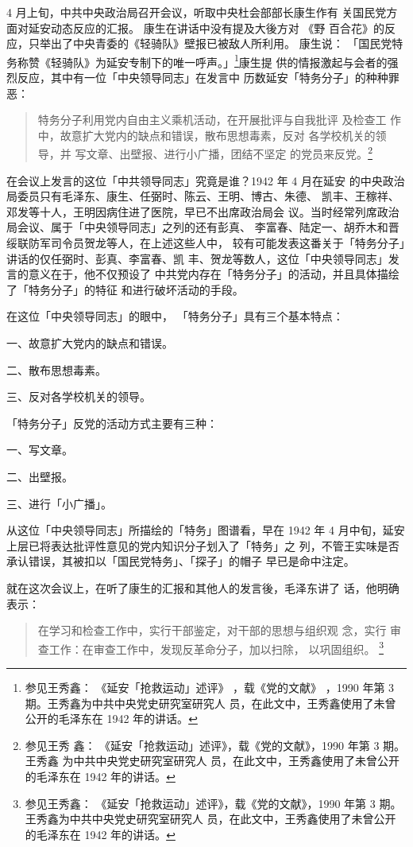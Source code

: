 4 月上旬，中共中央政治局召开会议，听取中央杜会部部长康生作有
关国民党方面对延安动态反应的汇报。
康生在讲话中没有提及大後方对
《野
百合花》的反应，只举出了中央青委的《轻骑队》壁报已被敌人所利用。
康生说：
「国民党特务称赞《轻骑队》为延安专制下的唯一呼声。」\footnote{参见王秀鑫：
《延安「抢救运动」述评》
，载《党的文献》
，1990 年第 3 期。王秀鑫为中共中央党史研究室研究人
员，在此文中，王秀鑫使用了未曾公开的毛泽东在 1942 年的讲话。
}康生提
供的情报激起与会者的强烈反应，其中有一位「中央领导同志」在发言中
历数延安「特务分子」的种种罪恶：
\begin{quote}
{\fzwkai 特务分子利用党内自由主义乘机活动，在开展批评与自我批评 及检查工
作中，故意扩大党内的缺点和错误，散布思想毒素，反对 各学校机关的领导，并
写文章、出壁报、进行小广播，团结不坚定 的党员来反党。\footnote{参见王秀
鑫： 《延安「抢救运动」述评》，载《党的文献》，1990 年第 3 期。王秀鑫
为中共中央党史研究室研究人 员，在此文中，王秀鑫使用了未曾公开的毛泽东在
1942 年的讲话。}} 
\end{quote}

在会议上发言的这位「中共领导同志」究竟是谁？1942 年 4 月在延安
的中央政治局委员只有毛泽东、康生、任弼时、陈云、王明、博古、朱德、
凯丰、王稼祥、邓发等十人，王明因病住进了医院，早已不出席政治局会
议。当时经常列席政治局会议、属于「中央领导同志」之列的还有彭真、
李富春、陆定一、胡乔木和晋绥联防军司令员贺龙等人，在上述这些人中，
较有可能发表这番关于「特务分子」讲话的仅任弼时、彭真、李富春、凯
丰、贺龙等数人，这位「中央领导同志」发言的意义在于，他不仅预设了
中共党内存在「特务分子」的活动，并且具体描绘了「特务分子」的特征
和进行破坏活动的手段。

在这位「中央领导同志」的眼中，
「特务分子」具有三个基本特点：

一、故意扩大党内的缺点和错误。

二、散布思想毒素。

三、反对各学校机关的领导。

「特务分子」反党的活动方式主要有三种：

一、写文章。

二、出壁报。

三、进行「小广播」。

从这位「中央领导同志」所描绘的「特务」图谱看，早在 1942 年 4
月中旬，延安上层已将表达批评性意见的党内知识分子划入了「特务」之
列，不管王实味是否承认错误，其被扣以「国民党特务」、「探子」的帽子
早已是命中注定。

就在这次会议上，在听了康生的汇报和其他人的发言後，毛泽东讲了
话，他明确表示：
\begin{quote}
{\fzwkai 在学习和检查工作中，实行干部鉴定，对干部的思想与组织观 念，实行
审查工作：在审查工作中，发现反革命分子，加以扫除， 以巩固组织。
\footnote{参见王秀鑫： 《延安「抢救运动」述评》，载《党的文献》，1990
年第 3 期。王秀鑫为中共中央党史研究室研究人
员，在此文中，王秀鑫使用了未曾公开的毛泽东在 1942 年的讲话。}} 
\end{quote}

